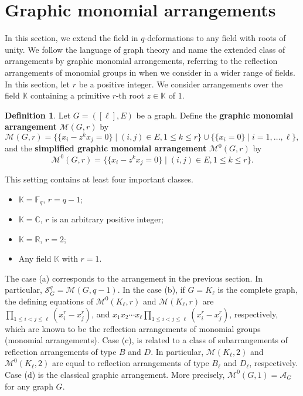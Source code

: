 \documentclass[12pt]{article}
\theoremstyle{plain}%
\theoremstyle{definition}
\newtheorem{definition}[theorem]{Definition}
\begin{document}
\section{Graphic monomial arrangements}\label{section3}

In this section, we extend the field in $q$-deformations to any field with roots of unity. We follow the language of graph theory and name the extended class of arrangements by graphic monomial arrangements, referring to the reflection arrangements of monomial groups in \cite{orlik1992arrangements} when we consider in a wider range of fields. In this section, let $r$ be a positive integer. We consider arrangements over the field $\mathbb{K}$ containing a primitive $r$-th root $z\in\mathbb{K}$ of $1$.

\begin{definition}
    Let $G=([\ell], E)$ be a graph. Define the \textbf{graphic monomial arrangement} $\mathcal{M}(G,r)$ by
    \[ \mathcal{M}(G,r)=\{\{x_i-z^k x_j=0\}\mid (i,j)\in E, 1\leq k\leq r\}\cup\{\{x_i=0\}\mid i= 1, \dots, \ell\}, \] and the \textbf{simplified graphic monomial arrangement} $\mathcal{M}^0(G,r)$ by
    \[ \mathcal{M}^0(G,r)=\{\{x_i-z^k x_j=0\}\mid (i,j)\in E, 1\leq k\leq r\}.\]
\end{definition}


This setting contains at least four important classes. 
\begin{itemize}
    \item[(a)] $\mathbb{K}=\mathbb{F}_q$, $r=q-1$;
    \item[(b)] $\mathbb{K}=\mathbb{C}$, $r$ is an arbitrary positive integer;
    \item[(c)] $\mathbb{K}=\mathbb{R}$, $r=2$;
    \item[(d)] Any field $\mathbb{K}$ with $r=1$.
\end{itemize}
 The case (a) corresponds to the arrangement in the previous section. In particular, $\mathcal{S}_G^q=\mathcal{M}(G, q-1)$. In the case (b), if $G=K_\ell$ is the complete graph, the defining equations of $\mathcal{M}^0(K_\ell, r)$ and $\mathcal{M}(K_\ell, r)$ are $\prod_{1\leq i<j\leq\ell}(x_i^r-x_j^r)$, and $x_1 x_2\cdots x_\ell\prod_{1\leq i<j\leq\ell}(x_i^r-x_j^r)$, respectively, which are known to be the reflection arrangements of monomial groups (monomial arrangements). Case (c), is related to a class of subarrangements of reflection arrangements of type $B$ and $D$. In particular, $\mathcal{M}(K_\ell, 2)$ and $\mathcal{M}^0(K_\ell, 2)$ are equal to reflection arrangements of type $B_\ell$ and $D_\ell$, respectively. 
Case (d) is the classical graphic arrangement. More precisely, $\mathcal{M}^0(G, 1)=\mathcal{A}_G$ for any graph $G$. 
\end{document}
